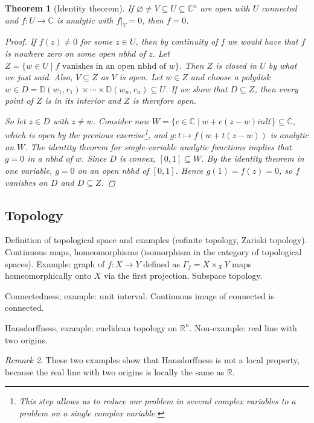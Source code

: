 \documentclass[11pt,A4]{article}
\theoremstyle{plain}
\newtheorem{thm}{Theorem}[section]
\theoremstyle{definition}
\theoremstyle{remark}
\newtheorem{rem}[thm]{Remark}
\newcommand{\R}{\mathbb{R}}
\newcommand{\1}{\mathbbm{1}}
\newcommand{\C}{\mathbb{C}}
\newcommand{\bbD}{\mathbb{D}}
\newcommand{\U}{\mathcal{U}}
\newcommand{\fp}[1]{\times_{#1}}
\newcommand{\db}{\marginnote{\dbend}}
\begin{document}
\begin{thm}[Identity theorem]
    If $\varnothing \neq V\subseteq U\subseteq \C^{n}$ are open with $U$ connected and $f\colon U\to \C$ is analytic with $f|_{V}=0$, then $f=0$.
    \begin{proof}
	If $f(z)\neq 0$ for some $z\in U$, then by continuity of $f$ we would have that $f$ is nowhere zero on some open nbhd of $z$.
	Let $Z=\{w\in U\mid f \text{ vanishes in an open nbhd of }w\}$.
	Then $Z$ is closed in $U$ by what we just said.
	Also, $V\subseteq Z$ as $V$ is open.
	Let $w\in Z$ and choose a polydisk $w\in D=\bbD(w_{1},r_{1})\times \cdots \times \bbD(w_{n},r_{n})\subseteq U$.
	If we show that $D\subseteq Z$, then every point of $Z$ is in its interior and $Z$ is therefore open.
	
	So let $z\in D$ with $z\neq w$.
	Consider now $W=\{c\in \C\mid w+c(z-w)in \U\}\subseteq \C$, which is open by the previous exercise\footnote{This step allows us to reduce our problem in several complex variables to a problem on a single complex variable.}, and $g\colon t\mapsto f(w+t(z-w))$ is analytic on $W$.
	The identity theorem for single-variable analytic functions implies that $g=0$ in a nbhd of $w$.
	Since $D$ is convex, $[0,1]\subseteq W$.
	By the identity theorem in one variable, $g=0$ on an open nbhd of $[0,1]$.
	Hence $g(1)=f(z)=0$, so $f$ vanishes on $D$ and $D\subseteq Z$.
    \end{proof}
\end{thm}

\subsection{Topology}

Definition of topological space and examples (cofinite topology, Zariski topology).
Continuous maps, homeomorphisms (isomorphism in the category of topological spaces).
Example: graph of $f\colon X\to Y$ defined as $\Gamma_{f}=X\fp{X}Y$ maps homeomorphically onto $X$ via the first projection.
Subspace topology.

Connectedness, example: unit interval.
Continuous image of connected is connected.

Hausdorffness, example: euclidean topology on $\R^{n}$.
Non-example: real line with two origins.

\begin{rem}
    \color{ForestGreen}
    \db These two examples show that Hausdorffness is not a local property, because the real line with two origins is locally the same as $\R$.
\end{rem}
\end{document}
